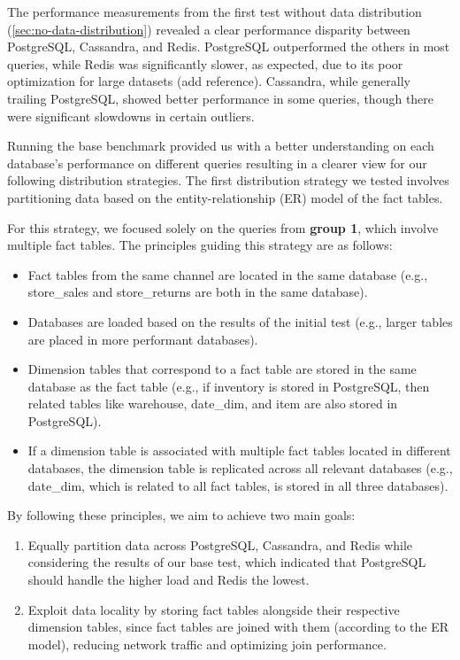 \documentclass[conference]{IEEEtran}
\begin{document}
The performance measurements from the first test without data distribution (\ref{sec:no-data-distribution})
revealed a clear performance disparity between PostgreSQL, Cassandra, and Redis. PostgreSQL outperformed
the others in most queries, while Redis was significantly slower, as expected, due to its poor optimization
for large datasets (add reference). Cassandra, while generally trailing PostgreSQL, showed better performance
in some queries, though there were significant slowdowns in certain outliers.

Running the base benchmark provided us with a better understanding on each database's performance on
different queries resulting in a clearer view for our following distribution strategies.
The first distribution strategy we tested involves partitioning data based on the entity-relationship
(ER) model of the fact tables.

For this strategy, we focused solely on the queries from \textbf{group 1}, which involve multiple fact tables.
The principles guiding this strategy are as follows:
\begin{itemize}
	\item Fact tables from the same channel are located in the same database (e.g., store\_sales and store\_returns are both in the same database).
	\item Databases are loaded based on the results of the initial test (e.g., larger tables are placed in more performant databases).
	\item Dimension tables that correspond to a fact table are stored in the same database as the fact table (e.g., if inventory is stored in PostgreSQL, then related tables like warehouse, date\_dim, and item are also stored in PostgreSQL).
	\item If a dimension table is associated with multiple fact tables located in different databases, the dimension table is replicated across all relevant databases (e.g., date\_dim, which is related to all fact tables, is stored in all three databases).
\end{itemize}

By following these principles, we aim to achieve two main goals:

\begin{enumerate}
	\item Equally partition data across PostgreSQL, Cassandra, and Redis while considering the results
	      of our base test, which indicated that PostgreSQL should handle the higher load and Redis the lowest.
	\item Exploit data locality by storing fact tables alongside their respective dimension tables,
	      since fact tables are joined with them (according to the ER model), reducing network traffic and optimizing join performance.
\end{enumerate}
\end{document}
